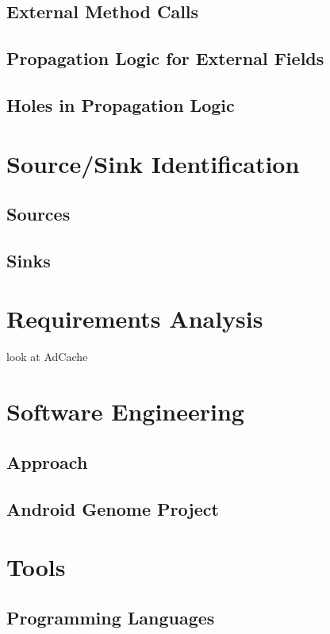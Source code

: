 \documentclass[12pt,twoside,notitlepage]{report}
\begin{document}
\subsection{External Method Calls}

\subsection{Propagation Logic for External Fields}

\subsection{Holes in Propagation Logic}

\section{Source/Sink Identification}

\subsection{Sources}

\subsection{Sinks}

\section{Requirements Analysis}
look at AdCache

\section{Software Engineering}

\subsection{Approach}

\subsection{Android Genome Project}

\section{Tools}

\subsection{Programming Languages}
\end{document}
